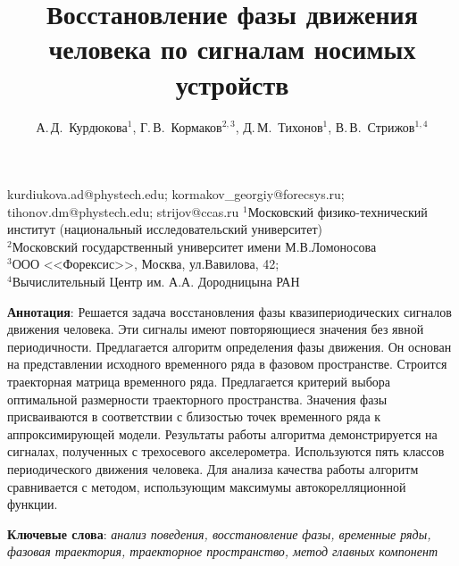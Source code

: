 \documentclass[12pt, twoside]{article}
\theoremstyle{definition}
\begin{document}
\title
    [] %
    {Восстановление фазы движения человека по сигналам носимых устройств}
\author
    [А.\,Д.~Курдюкова] %
    {А.\,Д.~Курдюкова$^{1}$, Г.\,В.~Кормаков$^{2, 3}$, Д.\,М.~Тихонов$^{1}$, В.\,В.~Стрижов$^{1, 4}$} %
\email
   {kurdiukova.ad@phystech.edu; kormakov\_georgiy@forecsys.ru; tihonov.dm@phystech.edu;  strijov@ccas.ru}
\organization
{$^1$Московский физико-технический институт
(национальный исследовательский университет)\\
$^2$Московский государственный университет имени М.В.Ломоносова\\ 
$^3$ООО <<Форексис>>, Москва, ул.Вавилова, 42;\\
$^4$Вычислительный Центр им. А.А. Дородницына РАН }
\abstract
  {\textbf{Аннотация}:
  Решается задача восстановления фазы квазипериодических сигналов движения человека. Эти сигналы имеют повторяющиеся значения без явной периодичности. Предлагается алгоритм определения фазы движения. Он основан на представлении исходного временного ряда в фазовом пространстве. Строится траекторная матрица временного ряда. Предлагается критерий выбора оптимальной размерности траекторного пространства. Значения фазы присваиваются в соответствии с близостью точек временного ряда к аппроксимирующей модели. Результаты работы алгоритма демонстрируется на сигналах, полученных с трехосевого акселерометра. Используются пять классов периодического движения человека. Для анализа качества работы алгоритм сравнивается с методом, использующим максимумы автокорелляционной функции.


\bigskip
\noindent
\textbf{Ключевые слова}: \emph {анализ поведения, восстановление фазы, временные ряды, фазовая траектория, траекторное пространство, метод главных компонент}
}

\doi{}
\receivedRus{}
\receivedEng{}

\maketitle
\linenumbers
\end{document}
